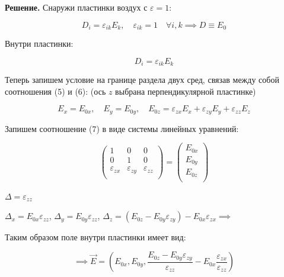 \documentclass[a4paper,12pt]{article}
\begin{document}
	\quad \textbf{Решение. } Снаружи пластинки воздух с $\varepsilon = 1$:
	
	\begin{equation}
		D_i = \varepsilon_{ik} E_k, \quad \varepsilon_{ik} = 1 \quad  \forall i,k \implies D \equiv E_0
	\end{equation} 
	
	\quad Внутри пластинки: 
	
	\begin{equation}
		D_i = \varepsilon_{ik} E_k
	\end{equation}
	
	\quad Теперь запишем условие на границе раздела двух сред, связав между собой соотношения (5) и (6): (ось $z$ выбрана перпендикулярной пластинке)
	
	\begin{equation}
		E_x = E_{0x}, \quad E_y = E_{0y}, \quad E_{0z} = \varepsilon_{zx} E_x + \varepsilon_{zy} E_y + \varepsilon_{zz} E_z
	\end{equation}
	
	
	\quad Запишем соотношение (7) в виде системы линейных уравнений: 
	
	\begin{equation}
		\left(\begin{array}{ccc}
			1 & 0 & 0 \\
			0 & 1 & 0 \\
			\varepsilon_{zx} & \varepsilon_{zy} & \varepsilon_{zz} \\
		\end{array}\right) = \left(\begin{array}{c}
			E_{0x} \\
			E_{0y} \\
			E_{0z} \\
		\end{array}\right)
	\end{equation}
	
	\begin{center}
		$\Delta = \varepsilon_{zz}$
		
		$\Delta_x = E_{0x}\varepsilon_{zz}$, $\Delta_y = E_{0y}\varepsilon_{zz }$, $\Delta_z = (E_{0z} - E_{0y}\varepsilon_{zy}) - E_{0x} \varepsilon_{zx} \implies $
	\end{center}
	
	\quad Таким образом поле внутри пластинки имеет вид:
	
	\begin{equation}
		\implies \vec{E} = \left(E_{0x}, E_{0y}, \dfrac{E_{0z}-E_{0y}\varepsilon_{zy}}{\varepsilon_{zz}} - E_{0x} \dfrac{\varepsilon_{zx}}{\varepsilon_{zz}}\right)
	\end{equation}
	
\end{document}
